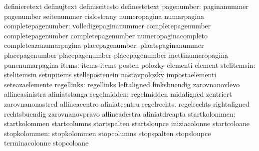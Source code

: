                                   definieretext                    definujtext
                                  definiscitesto                   definestetext
                      pagenumber: paginanummer                     pagenumber
                                  seitenummer                      cislostrany
                                  numeropagina                     numarpagina
              completepagenumber: volledigepaginanummer            completepagenumber
                                  completepagenumber               completepagenumber %
                                  numeropaginacompleto             completeazanumarpagina %
                 placepagenumber: plaatspaginanummer               placepagenumber
                                  placepagenumber                  placepagenumber %
                                  mettinumeropagina                punenumarpagina %
                           items: items                            items
                                  posten                           polozky
                                  elementi                         element
                     stelitemsin: stelitemsin                      setupitems
                                  stellepostenein                  nastavpolozky
                                  impostaelementi                  seteazaelemente
                      regellinks: regellinks                       leftaligned
                                  linksbuendig                     zarovnanovlevo
                                  allineasinistra                  aliniatstanga
                     regelmidden: regelmidden                      midaligned
                                  zentriert                        zarovnanonastred
                                  allineacentro                    aliniatcentru
                     regelrechts: regelrechts                      rightaligned
                                  rechtsbuendig                    zarovnanovpravo
                                  allineadestra                    aliniatdreapta
                   startkolommen: startkolommen                    startcolumns
                                  startspalten                     startsloupce
                                  iniziacolonne                    startcoloane
                    stopkolommen: stopkolommen                     stopcolumns
                                  stopspalten                      stopsloupce
                                  terminacolonne                   stopcoloane
